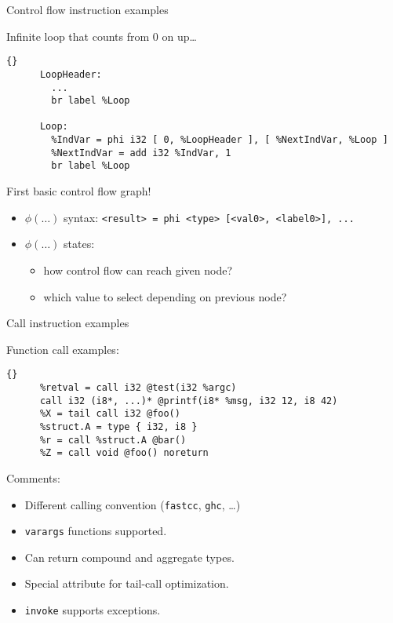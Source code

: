 \documentclass[8pt]{beamer}
\begin{document}
\begin{frame}[fragile]{Control flow instruction examples}
  \begin{exampleblock}{Infinite loop that counts from 0 on up\ldots}
    \begin{lstlisting}{}
      LoopHeader:
        ...
        br label %Loop

      Loop:
        %IndVar = phi i32 [ 0, %LoopHeader ], [ %NextIndVar, %Loop ]
        %NextIndVar = add i32 %IndVar, 1
        br label %Loop
    \end{lstlisting}
  \end{exampleblock}

  \begin{block}{First basic control flow graph!}
    \begin{itemize}
      \item $\phi(\ldots)$ syntax: \verb+<result> = phi <type> [<val0>, <label0>], ...+
      \item $\phi(\ldots)$ states:
        \begin{itemize}
          \item how control flow can reach given node?
          \item which value to select depending on previous node?
        \end{itemize}
    \end{itemize}
  \end{block}
\end{frame}

\begin{frame}[fragile]{Call instruction examples}
  \begin{exampleblock}{Function call examples:}
    \begin{lstlisting}{}
      %retval = call i32 @test(i32 %argc)
      call i32 (i8*, ...)* @printf(i8* %msg, i32 12, i8 42)
      %X = tail call i32 @foo()
      %struct.A = type { i32, i8 }
      %r = call %struct.A @bar()
      %Z = call void @foo() noreturn
    \end{lstlisting}
  \end{exampleblock}

  \begin{block}{Comments:}
    \begin{itemize}
      \item Different calling convention (\verb+fastcc+, \verb+ghc+, \ldots)
      \item \verb+varargs+ functions supported.
      \item Can return compound and aggregate types.
      \item Special attribute for tail-call optimization.
      \item \verb+invoke+ supports exceptions.
    \end{itemize}
  \end{block}
\end{frame}
\end{document}
